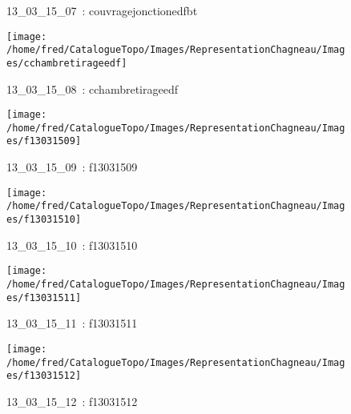 \documentclass[12pt,titlepage]{book}
\begin{document}
\begin{figure}[h!]
\begin{minipage}[t]{3cm}
\begin{center}
      \caption[~13\_03\_15\_07]{\small{13\_03\_15\_07~:} \tiny{couvragejonctionedfbt}}\label{couvragejonctionedfbt}
    \end{center}
  \end{minipage}
  \begin{minipage}[t]{3cm}
    \begin{center}
      \texttt{[image: /home/fred/CatalogueTopo/Images/RepresentationChagneau/Images/cchambretirageedf]}
      \caption[~13\_03\_15\_08]{\small{13\_03\_15\_08~:} \tiny{cchambretirageedf}}\label{cchambretirageedf}
    \end{center}
  \end{minipage}
  \begin{minipage}[t]{3cm}
    \begin{center}
      \texttt{[image: /home/fred/CatalogueTopo/Images/RepresentationChagneau/Images/f13031509]}
      \caption[~13\_03\_15\_09]{\small{13\_03\_15\_09~:} \tiny{f13031509}}\label{f13031509}
    \end{center}
  \end{minipage}
  \begin{minipage}[t]{3cm}
    \begin{center}
      \texttt{[image: /home/fred/CatalogueTopo/Images/RepresentationChagneau/Images/f13031510]}
      \caption[~13\_03\_15\_10]{\small{13\_03\_15\_10~:} \tiny{f13031510}}\label{f13031510}
    \end{center}
  \end{minipage}
  \begin{minipage}[t]{3cm}
    \begin{center}
      \texttt{[image: /home/fred/CatalogueTopo/Images/RepresentationChagneau/Images/f13031511]}
      \caption[~13\_03\_15\_11]{\small{13\_03\_15\_11~:} \tiny{f13031511}}\label{f13031511}
    \end{center}
  \end{minipage}
  \begin{minipage}[t]{3cm}
    \begin{center}
      \texttt{[image: /home/fred/CatalogueTopo/Images/RepresentationChagneau/Images/f13031512]}
      \caption[~13\_03\_15\_12]{\small{13\_03\_15\_12~:} \tiny{f13031512}}\label{f13031512}
    \end{center}
  \end{minipage}
\end{figure}
\end{document}

